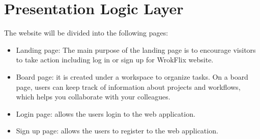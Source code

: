 \section{Presentation Logic Layer}

The website will be divided into the following pages:
\begin{itemize}
    \item Landing page: The main purpose of the landing page is to encourage visitors to take action including log in or sign up for WrokFlix website.
    \item Board page: it is created under a workspace to organize tasks. On a board page, users can keep track of information about projects and workflows, which helps you collaborate with your colleagues.
    \item Login page: allows the users login to the web application. 
    \item Sign up page: allows the users to register to the web application.
\end{itemize}



